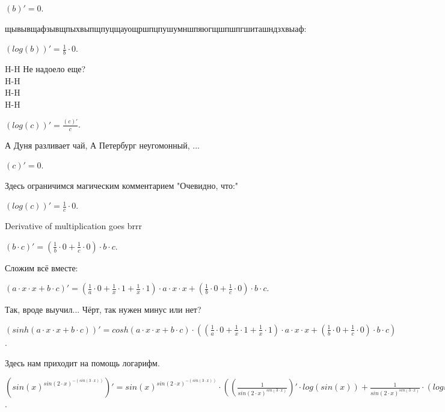 \documentclass{article}
\begin{document}
\begin{center}$(b)' = 0$.\end{center}
щывывщафзывщпыхвыпщпуцщауощршпцпушумншпяюгщшпшпгшиташндзхвыаф:\\
\begin{center}$(log(b))'=  \frac {1} {{b}} \cdot {0}$.\end{center}
H-H Не надоело еще?\\
H-H\\
H-H\\
H-H\\
\begin{center}$(log(c))'= \frac { (c)'} {c}$.\end{center}
А Дуня разливает чай, А Петербург неугомонный, ...\\
\begin{center}$(c)' = 0$.\end{center}
Здесь ограничимся магическим комментарием "Очевидно, что:"\\
\begin{center}$(log(c))'=  \frac {1} {{c}} \cdot {0}$.\end{center}
Derivative of multiplication goes brrr\\
\begin{center}$(b \cdot c)'= ( \frac {1} {{b}} \cdot {0}+ \frac {1} {{c}} \cdot {0}) \cdot b \cdot c$.\end{center}
Сложим всё вместе:\\
\begin{center}$(a \cdot x \cdot x+b \cdot c)'= ( \frac {1} {{a}} \cdot {0}+ \frac {1} {{x}} \cdot {1}+ \frac {1} {{x}} \cdot {1}) \cdot a \cdot x \cdot x+( \frac {1} {{b}} \cdot {0}+ \frac {1} {{c}} \cdot {0}) \cdot b \cdot c$.\end{center}
Так, вроде выучил... Чёрт, так нужен минус или нет?\\
\begin{center}$(sinh(a \cdot x \cdot x+b \cdot c))'= cosh(a \cdot x \cdot x+b \cdot c) \cdot (( \frac {1} {{a}} \cdot {0}+ \frac {1} {{x}} \cdot {1}+ \frac {1} {{x}} \cdot {1}) \cdot a \cdot x \cdot x+( \frac {1} {{b}} \cdot {0}+ \frac {1} {{c}} \cdot {0}) \cdot b \cdot c)$.\end{center}
Здесь нам приходит на помощь логарифм.\\
\begin{center}$({sin(x)^{sin({2} \cdot x)^{-(sin({3} \cdot x))}}})'={sin(x)^{sin({2} \cdot x)^{-(sin({3} \cdot x))}}} \cdot (( \frac {1} {{sin({2} \cdot x)} ^ {sin({3} \cdot x)}})'\cdot log(sin(x)) +  \frac {1} {{sin({2} \cdot x)} ^ {sin({3} \cdot x)}} \cdot (logsin(x))')$.\end{center}
\end{document}

